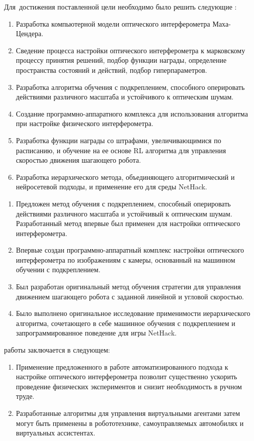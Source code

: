 Для~достижения поставленной цели необходимо было решить следующие {\tasks}:
\begin{enumerate}[beginpenalty=10000] %
  \item Разработка компьютерной модели оптического интерферометра Маха-Цендера.
  \item Сведение процесса настройки оптического интерферометра к марковскому процессу принятия решений, подбор функции награды, определение пространства состояний и действий, подбор гиперпараметров.
  \item Разработка алгоритма обучения с подкреплением, способного оперировать действиями различного масштаба и устойчивого к оптическим шумам.
  \item Создание программно-аппаратного комплекса для использования алгоритма при настройке физического интерферометра.
  \item Разработка функции награды со штрафами, увеличивающимися по расписанию, и обучение на ее основе RL алгоритма для управления скоростью движения шагающего робота.
  \item Разработка иерархического метода, объединяющего алгоритмический и нейросетевой подходы, и применение его для среды NetHack.
\end{enumerate}


{\novelty}
\begin{enumerate}[beginpenalty=10000] %
  \item Предложен метод обучения с подкреплением, способный оперировать действиями различного масштаба и устойчивый к оптическим шумам. Разработанный метод впервые был применен для настройки оптического интерферометра. 
  \item Впервые создан программно-аппаратный комплекс настройки оптического интерферометра по изображениям с камеры, основанный на машинном обучении с подкреплением.
  \item Был разработан оригинальный метод обучения стратегии для управления движением шагающего робота с заданной линейной и угловой скоростью.
  \item Было выполнено оригинальное исследование применимости иерархического алгоритма, сочетающего в себе машинное обучения с подкреплением и запрограммированное поведение для игры NetHack.
\end{enumerate}

{\influence} работы заключается в следующем:
\begin{enumerate}[beginpenalty=10000] %
  \item Применение предложенного в работе автоматизированного подхода к настройке оптического интерферометра позволит существенно ускорить проведение физических экспериментов и снизит необходимость в ручном труде. 
  \item Разработанные алгоритмы для управления виртуальными агентами затем могут быть применены в робототехнике, самоуправляемых автомобилях и виртуальных ассистентах. 
\end{enumerate}

